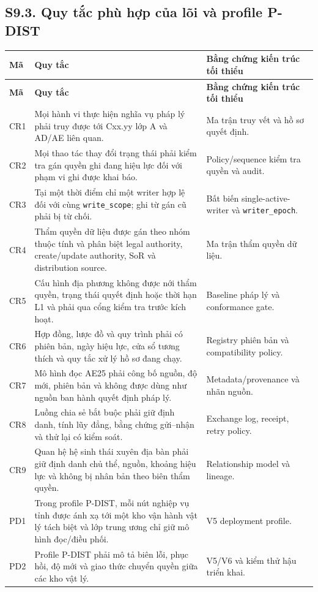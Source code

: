 \documentclass[a4paper,11pt]{article}
\begin{document}
\subsection*{S9.3. Quy tắc phù hợp của lõi và profile P-DIST}
\small
\renewcommand{\arraystretch}{1.02}
\setlength{\tabcolsep}{2.4pt}
\begin{longtable}{@{}p{0.9cm}p{9.5cm}p{4.2cm}@{}}
\toprule
\textbf{Mã} & \textbf{Quy tắc} & \textbf{Bằng chứng kiến trúc tối thiểu} \\
\midrule
\endfirsthead
\toprule
\textbf{Mã} & \textbf{Quy tắc} & \textbf{Bằng chứng kiến trúc tối thiểu} \\
\midrule
\endhead
\bottomrule
\endfoot
CR1 & Mọi hành vi thực hiện nghĩa vụ pháp lý phải truy được tới Cxx.yy lớp A và AD/AE liên quan. & Ma trận truy vết và hồ sơ quyết định. \\
CR2 & Mọi thao tác thay đổi trạng thái phải kiểm tra gán quyền ghi đang hiệu lực đối với phạm vi ghi được khai báo. & Policy/sequence kiểm tra quyền và audit. \\
CR3 & Tại một thời điểm chỉ một writer hợp lệ đối với cùng \texttt{write\_scope}; ghi từ gán cũ phải bị từ chối. & Bất biến single-active-writer và \texttt{writer\_epoch}. \\
CR4 & Thẩm quyền dữ liệu được gán theo nhóm thuộc tính và phân biệt legal authority, create/update authority, SoR và distribution source. & Ma trận thẩm quyền dữ liệu. \\
CR5 & Cấu hình địa phương không được nới thẩm quyền, trạng thái quyết định hoặc thời hạn L1 và phải qua cổng kiểm tra trước kích hoạt. & Baseline pháp lý và conformance gate. \\
CR6 & Hợp đồng, lược đồ và quy trình phải có phiên bản, ngày hiệu lực, cửa sổ tương thích và quy tắc xử lý hồ sơ đang chạy. & Registry phiên bản và compatibility policy. \\
CR7 & Mô hình đọc AE25 phải công bố nguồn, độ mới, phiên bản và không được dùng như nguồn ban hành quyết định pháp lý. & Metadata/provenance và nhãn nguồn. \\
CR8 & Luồng chia sẻ bắt buộc phải giữ định danh, tính lũy đẳng, bằng chứng gửi--nhận và thử lại có kiểm soát. & Exchange log, receipt, retry policy. \\
CR9 & Quan hệ hệ sinh thái xuyên địa bàn phải giữ định danh chủ thể, nguồn, khoảng hiệu lực và không bị nhân bản theo biên thẩm quyền. & Relationship model và lineage. \\
PD1 & Trong profile P-DIST, mỗi nút nghiệp vụ tỉnh được ánh xạ tới một kho vận hành vật lý tách biệt và lớp trung ương chỉ giữ mô hình đọc/điều phối. & V5 deployment profile. \\
PD2 & Profile P-DIST phải mô tả biên lỗi, phục hồi, độ mới và giao thức chuyển quyền giữa các kho vật lý. & V5/V6 và kiểm thử hậu triển khai. \\
\end{longtable}
\normalsize
\end{document}
